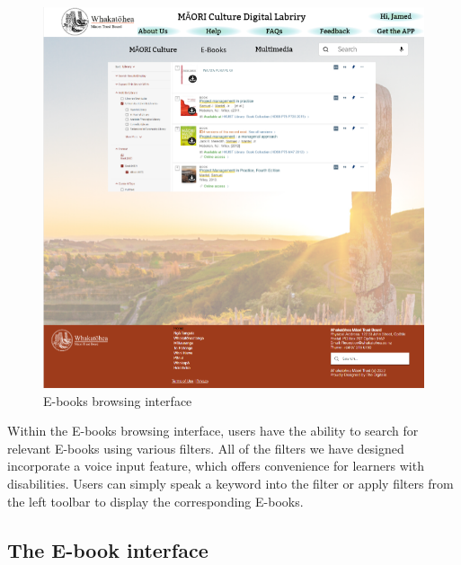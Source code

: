 \begin{figure}[htbp]
  \centerline{\includegraphics[width=400pt]{images/3-2-1.png}}
  \caption{E-books browsing interface}
  \label{fig30}
\end{figure}

Within the E-books browsing interface, users have the ability to search for relevant E-books using various filters. All of the filters we have designed incorporate a voice input feature, which offers convenience for learners with disabilities. Users can simply speak a keyword into the filter or apply filters from the left toolbar to display the corresponding E-books.

\subsection{The E-book interface}

